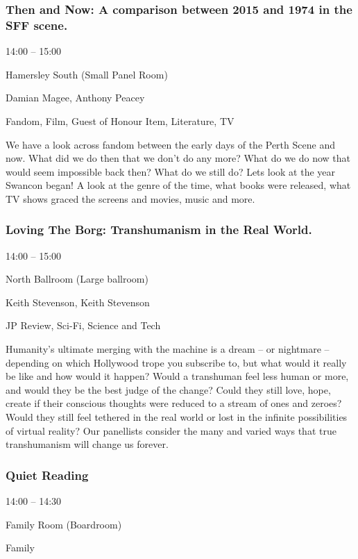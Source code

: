 \documentclass{scrreprt}
\begin{document}
\begin{multicols}{2}
\subsubsection*{Then and Now: A comparison between 2015 and 1974 in the SFF scene.}\begin{description}
\setlength{\itemsep}{0pt}
\setlength{\parsep}{0pt}
\setlength{\parskip}{0pt}
\item[Time:]{14:00 -- 15:00}
\item[Venue:]{Hamersley South (Small Panel Room)}
\item[People:]{Damian Magee, Anthony Peacey}
\item[Tags:]{Fandom, Film, Guest of Honour Item, Literature, TV}\end{description}
We have a look across fandom between the early days of the Perth Scene and now. What did we do then that we don't do any more? What do we do now that would seem impossible back then? What do we still do? Lets look at the year Swancon began! A look at the genre of the time, what books were released, what TV shows graced the screens and movies, music and more.
\subsubsection*{Loving The Borg: Transhumanism in the Real World.}\begin{description}
\setlength{\itemsep}{0pt}
\setlength{\parsep}{0pt}
\setlength{\parskip}{0pt}
\item[Time:]{14:00 -- 15:00}
\item[Venue:]{North Ballroom (Large ballroom)}
\item[People:]{Keith Stevenson, Keith Stevenson}
\item[Tags:]{JP Review, Sci-Fi, Science and Tech}\end{description}
Humanity’s ultimate merging with the machine is a dream – or nightmare – depending on which Hollywood trope you subscribe to, but what would it really be like and how would it happen? Would a transhuman feel less human or more, and would they be the best judge of the change? Could they still love, hope, create if their conscious thoughts were reduced to a stream of ones and zeroes? Would they still feel tethered in the real world or lost in the infinite possibilities of virtual reality? Our panellists consider the many and varied ways that true transhumanism will change us forever.
\subsubsection*{Quiet Reading}\begin{description}
\setlength{\itemsep}{0pt}
\setlength{\parsep}{0pt}
\setlength{\parskip}{0pt}
\item[Time:]{14:00 -- 14:30}
\item[Venue:]{Family Room (Boardroom)}
\item[Tags:]{Family}\end{description}


\end{multicols}
\end{document}
